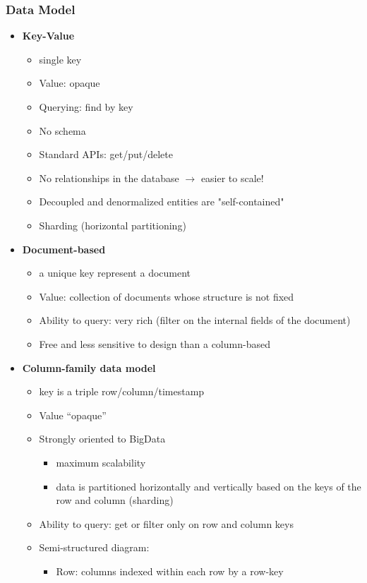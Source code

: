 \documentclass[10pt,a4paper]{article}
\begin{document}
\subsubsection{Data Model}
\begin{itemize}
	\item \textbf{Key-Value}
	\begin{itemize}
		\item single key
		\item Value: opaque
		\item Querying: find by key
		\item No schema
		\item Standard APIs: get/put/delete
		\item No relationships in the database $\rightarrow$ easier to scale!
		\item Decoupled and denormalized entities are "self-contained"
		\item Sharding (horizontal partitioning)
	\end{itemize}
	\item \textbf{Document-based}
	\begin{itemize}
		\item a unique key represent a document
		\item Value: collection of documents whose structure is not fixed
		\item Ability to query: very rich (filter on the internal fields of the document)
		\item Free and less sensitive to design than a column-based
	\end{itemize}
	\item \textbf{Column-family data model}
	\begin{itemize}
		\item key is a triple row/column/timestamp
		\item Value “opaque”
		\item Strongly oriented to BigData
		\begin{itemize}
			\item maximum scalability
			\item data is partitioned horizontally and vertically based on the keys of the row and column (sharding)
		\end{itemize}		 
		\item Ability to query: get or filter only on row and column keys
		\item Semi-structured diagram:
		\begin{itemize}
			\item Row: columns indexed within each row by a row-key

\end{itemize}
\end{itemize}
\end{itemize}
\end{document}
